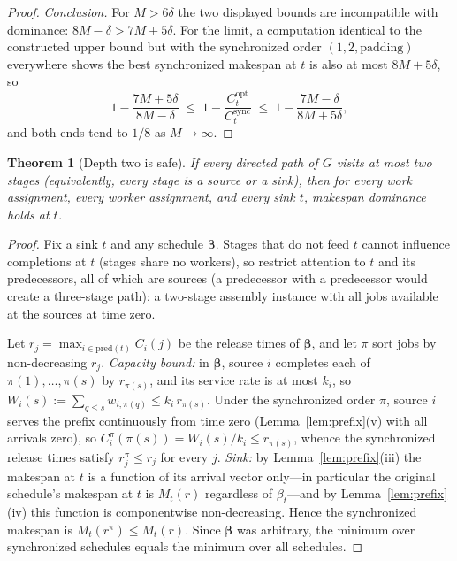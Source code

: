 \documentclass[sn-mathphys,NameDate]{sn-jnl}
\theoremstyle{thmstyleone}
\newtheorem{theorem}{Theorem}
\theoremstyle{thmstylethree}
\theoremstyle{thmstyletwo}
\begin{document}
\begin{proof}
\emph{Conclusion.} For $M > 6\delta$ the two displayed bounds
are incompatible with dominance:
$8M - \delta > 7M + 5\delta$. For the limit, a computation
identical to the constructed upper bound but with the
synchronized order $(1, 2, \text{padding})$ everywhere shows
the best synchronized makespan at $t$ is also at most
$8M + 5\delta$, so
\[
  1 - \frac{7M + 5\delta}{8M - \delta}
  \;\leq\;
  1 - \frac{C^{\mathrm{opt}}_t}{C^{\mathrm{sync}}_t}
  \;\leq\;
  1 - \frac{7M - \delta}{8M + 5\delta},
\]
and both ends tend to $1/8$ as $M \to \infty$. \qedhere
\end{proof}

\begin{theorem}[Depth two is safe]
\label{thm:positive}
If every directed path of $G$ visits at most two stages
(equivalently, every stage is a source or a sink), then for
every work assignment, every worker assignment, and every sink
$t$, makespan dominance holds at $t$.
\end{theorem}

\begin{proof}
Fix a sink $t$ and any schedule $\boldsymbol\beta$. Stages
that do not feed $t$ cannot influence completions at $t$
(stages share no workers), so restrict attention to $t$ and
its predecessors, all of which are sources (a predecessor with
a predecessor would create a three-stage path): a two-stage
assembly instance with all jobs available at the sources at
time zero.

Let $r_j = \max_{i \in \mathrm{pred}(t)} C_i(j)$ be the
release times of $\boldsymbol\beta$, and let $\pi$ sort jobs
by non-decreasing $r_j$. \emph{Capacity bound:} in
$\boldsymbol\beta$, source $i$ completes each of
$\pi(1), \ldots, \pi(s)$ by $r_{\pi(s)}$, and its service rate
is at most $k_i$, so
$W_i(s) := \sum_{q \leq s} w_{i,\pi(q)} \leq k_i\,
r_{\pi(s)}$. Under the synchronized order $\pi$, source $i$
serves the prefix continuously from time zero
(Lemma~\ref{lem:prefix}(v) with all arrivals zero), so
$C^\pi_i(\pi(s)) = W_i(s)/k_i \leq r_{\pi(s)}$, whence the
synchronized release times satisfy $r^\pi_j \leq r_j$ for
every $j$. \emph{Sink:} by Lemma~\ref{lem:prefix}(iii) the
makespan at $t$ is a function of its arrival vector only---in
particular the original schedule's makespan at $t$ is
$M_t(r)$ regardless of $\beta_t$---and by
Lemma~\ref{lem:prefix}(iv) this function is componentwise
non-decreasing. Hence the synchronized makespan is
$M_t(r^\pi) \leq M_t(r)$. Since $\boldsymbol\beta$ was
arbitrary, the minimum over synchronized schedules equals the
minimum over all schedules.
\end{proof}
\end{document}
